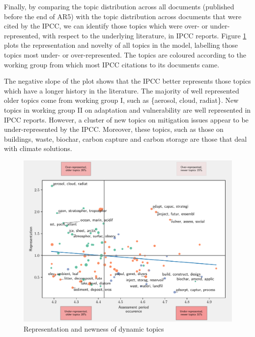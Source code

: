 \documentclass{article}
\begin{document}
\begin{linenumbers}
Finally, by comparing the topic distribution across all documents (published before the end of AR5) with the topic distribution across documents that were cited by the IPCC, we can identify those topics which were over- or under- represented, with respect to the underlying literature, in IPCC reports. Figure \ref{representation} plots the representation and novelty of all topics in the model, labelling those topics most under- or over-represented. The topics are coloured according to the working group from which most IPCC citations to its documents came.

The negative slope of the plot shows that the IPCC better represents those topics which have a longer history in the literature. The majority of well represented older topics come from working group I, such as \{aerosol, cloud, radiat\}. New topics in working group II on adaptation and vulnerability are well represented in IPCC reports. However, a cluster of new topics on mitigation issues appear to be under-represented by the IPCC. Moreover, these topics, such as those on buildings, waste, biochar, carbon capture and carbon storage are those that deal with climate solutions.


\begin{figure}
	\begin{center}
		\includegraphics[width=1\linewidth]{plots/ipcc_representation/ipcc_rep_new665_all.pdf}
		\caption{Representation and newness of dynamic topics}
		\label{representation}
	\end{center}
\end{figure}



\end{linenumbers}
\end{document}
